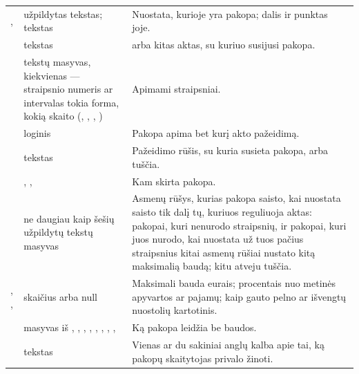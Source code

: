 \par\nopagebreak
\begin{xltabular}{\textwidth}{@{}L{38mm}L{40mm}Y@{}}
\toprule
{} &  &  \\
\midrule
\endhead
\bottomrule
\endlastfoot
{},  & užpildytas tekstas; tekstas & Nuostata, kurioje yra pakopa; dalis ir punktas joje. \\
 & tekstas &  arba kitas aktas, su kuriuo susijusi pakopa. \\
 & tekstų masyvas, kiekvienas --- straipsnio numeris ar intervalas tokia forma, kokią skaito  (, , , ) & Apimami straipsniai. \\
 & loginis & Pakopa apima bet kurį akto pažeidimą. \\
 & tekstas & Pažeidimo rūšis, su kuria susieta pakopa, arba tuščia. \\
 & , ,  & Kam skirta pakopa. \\
 & ne daugiau kaip šešių užpildytų tekstų masyvas & Asmenų rūšys, kurias pakopa saisto, kai nuostata saisto tik dalį tų, kuriuos reguliuoja aktas: pakopai, kuri nenurodo straipsnių, ir pakopai, kuri juos nurodo, kai nuostata už tuos pačius straipsnius kitai asmenų rūšiai nustato kitą maksimalią baudą; kitu atveju tuščia. \\
, ,  & skaičius arba null & Maksimali bauda eurais; procentais nuo metinės apyvartos ar pajamų; kaip gauto pelno ar išvengtų nuostolių kartotinis. \\
 & masyvas iš , , , , , , , ,  & Ką pakopa leidžia be baudos. \\
 & tekstas & Vienas ar du sakiniai anglų kalba apie tai, ką pakopų skaitytojas privalo žinoti. \\
\end{xltabular}

